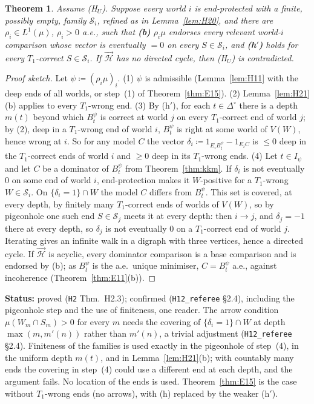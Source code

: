 \documentclass[11pt]{article}
\newtheorem{theorem}{Theorem}[section]
\theoremstyle{definition}
\theoremstyle{remark}
\newcommand{\Di}{\Delta^{\circ}}
\newcommand{\src}[1]{\texttt{#1}}
\newcommand{\status}[1]{\par\smallskip\noindent\textbf{Status:} #1\par\smallskip}
\begin{document}
\begin{theorem}\label{thm:H23}
Assume (H$_U$). Suppose every world $i$ is end-protected with a finite, possibly empty, family $\mathcal S_i$, refined as in Lemma~\ref{lem:H20}, and there are $\rho_i\in L^1(\mu)$, $\rho_i>0$ a.e., such that \textbf{(b)} $\rho_i\mu$ endorses every relevant world-$i$ comparison whose vector is eventually $=0$ on every $S\in\mathcal S_i$, and \textbf{(h$'$)} holds for every $T_1$-correct $S\in\mathcal S_i$. If $\vec{\mathcal H}$ has no directed cycle, then (H$_U$) is contradicted.
\end{theorem}
\begin{proof}[Proof sketch]
Let $\psi\coloneqq(\rho_i\mu)_i$. (1) $\psi$ is admissible (Lemma~\ref{lem:H11} with the deep ends of all worlds, or step~(1) of Theorem~\ref{thm:E15}). (2) Lemma~\ref{lem:H21}(b) applies to every $T_1$-wrong end. (3) By (h$'$), for each $t\in\Di$ there is a depth $m(t)$ beyond which $B^\psi_t$ is correct at world $j$ on every $T_1$-correct end of world $j$; by (2), deep in a $T_1$-wrong end of world $i$, $B^\psi_t$ is right at some world of $V(W)$, hence wrong at $i$. So for any model $C$ the vector $\delta_i\coloneqq1_{E_iB^\psi_t}-1_{E_iC}$ is $\le0$ deep in the $T_1$-correct ends of world $i$ and $\ge0$ deep in its $T_1$-wrong ends. (4) Let $t\in I_\psi$ and let $C$ be a dominator of $B^\psi_t$ from Theorem~\ref{thm:kkm}. If $\delta_i$ is not eventually $0$ on some end of world $i$, end-protection makes it $W$-positive for a $T_1$-wrong $W\in\mathcal S_i$. On $\{\delta_i=1\}\cap W$ the model $C$ differs from $B^\psi_t$. This set is covered, at every depth, by finitely many $T_1$-correct ends of worlds of $V(W)$, so by pigeonhole one such end $S\in\mathcal S_j$ meets it at every depth: then $i\to j$, and $\delta_j=-1$ there at every depth, so $\delta_j$ is not eventually $0$ on a $T_1$-correct end of world $j$. Iterating gives an infinite walk in a digraph with three vertices, hence a directed cycle. If $\vec{\mathcal H}$ is acyclic, every dominator comparison is a base comparison and is endorsed by (b); as $B^\psi_t$ is the a.e.\ unique minimiser, $C=B^\psi_t$ a.e., against incoherence (Theorem~\ref{thm:E11}(b)).
\end{proof}
\status{proved (\src{H2} Thm.~H2.3); confirmed (\src{H12\_referee} \S2.4), including the pigeonhole step and the use of finiteness, one reader. The arrow condition $\mu(W_m\cap S_m)>0$ for every $m$ needs the covering of $\{\delta_i=1\}\cap W$ at depth $\max(m,m'(n))$ rather than $m'(n)$, a trivial adjustment (\src{H12\_referee} \S2.4). Finiteness of the families is used exactly in the pigeonhole of step~(4), in the uniform depth $m(t)$, and in Lemma~\ref{lem:H21}(b); with countably many ends the covering in step~(4) could use a different end at each depth, and the argument fails. No location of the ends is used. Theorem~\ref{thm:E15} is the case without $T_1$-wrong ends (no arrows), with (h) replaced by the weaker (h$'$).}
\end{document}
